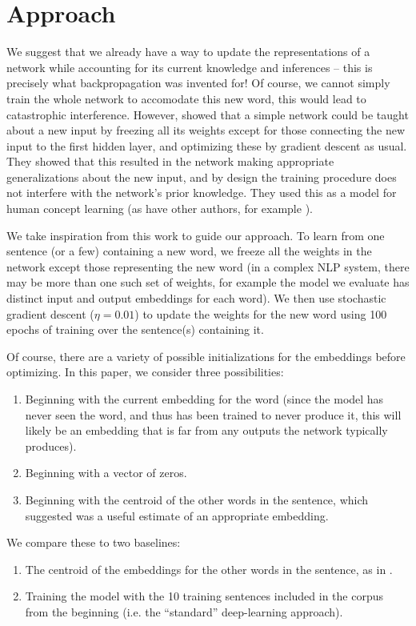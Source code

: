 \documentclass{article}
\begin{document}
\section{Approach}
We suggest that we already have a way to update the representations of a network while accounting for its current knowledge and inferences -- this is precisely what backpropagation was invented for! Of course, we cannot simply train the whole network to accomodate this new word, this would lead to catastrophic interference. However, \citet{Rumelhart1993} showed that a simple network could be taught about a new input by freezing all its weights except for those connecting the new input to the first hidden layer, and optimizing these by gradient descent as usual. They showed that this resulted in the network making appropriate generalizations about the new input, and by design the training procedure does not interfere with the network's prior knowledge. They used this as a model for human concept learning (as have other authors, for example \citet{Rogers2004}). \par
We take inspiration from this work to guide our approach. To learn from one sentence (or a few) containing a new word, we freeze all the weights in the network except those representing the new word (in a complex NLP system, there may be more than one such set of weights, for example the model we evaluate has distinct input and output embeddings for each word). We then use stochastic gradient descent (\(\eta = 0.01\)) to update the weights for the new word using 100 epochs of training over the sentence(s) containing it. \par
Of course, there are a variety of possible initializations for the embeddings before optimizing. In this paper, we consider three possibilities: 
\begin{enumerate}
\item Beginning with the current embedding for the word (since the model has never seen the word, and thus has been trained to never produce it, this will likely be an embedding that is far from any outputs the network typically produces).
\item Beginning with a vector of zeros.
\item Beginning with the centroid of the other words in the sentence, which \citet{Lazaridou2017} suggested was a useful estimate of an appropriate embedding.
\end{enumerate}
We compare these to two baselines:
\begin{enumerate}
\item The centroid of the embeddings for the other words in the sentence, as in \citet{Lazaridou2017}. 
\item Training the model with the 10 training sentences included in the corpus from the beginning (i.e. the ``standard'' deep-learning approach).
\end{enumerate}
\end{document}
